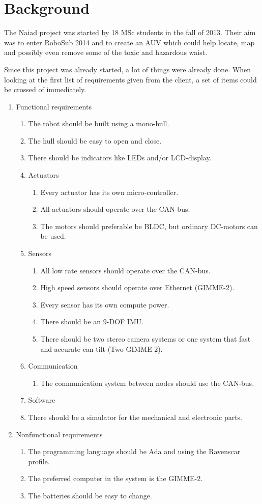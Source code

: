 \section{Background}
The Naiad project was started by 18 MSc students in the fall of 2013. Their aim was to enter RoboSub 2014 and to create an AUV which could help locate, map and possibly even remove some of the toxic and hazardous waist. 

Since this project was already started, a lot of things were already done. When looking at the first list of requirements given from the client, a set of items could be crossed of immediately. 

\begin{enumerate}
\item Functional requirements
\begin{enumerate}
\item The robot should be built using a mono-hull.
\item The hull should be easy to open and close.
\item There should be indicators like LEDs and/or LCD-display.
\item Actuators
\begin{enumerate}
\item Every actuator has its own micro-controller.
\item All actuators should operate over the CAN-bus.
\item The motors should preferable be BLDC, but ordinary DC-motors can be used.
\end{enumerate}
\item Sensors
\begin{enumerate}
\item All low rate sensors should operate over the CAN-bus.
\item High speed sensors should operate over Ethernet (GIMME-2).
\item Every sensor has its own compute power.
\item There should be an 9-DOF IMU.
\item There should be two stereo camera systems or one system that fast and accurate can tilt (Two GIMME-2).
\end{enumerate}
\item Communication
\begin{enumerate}
\item The communication system between nodes should use the CAN-bus.
\end{enumerate}
\item Software
\item There should be a simulator for the mechanical and electronic parts.
\end{enumerate}
\item Nonfunctional requirements
\begin{enumerate}
\item The programming language should be Ada and using the Ravenscar profile.
\item The preferred computer in the system is the GIMME-2.
\item The batteries should be easy to change.
\end{enumerate}
\end{enumerate}
